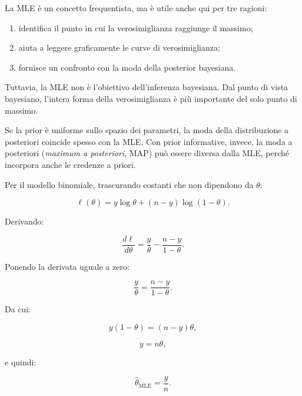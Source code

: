 \documentclass[
  italian,
  letterpaper,
  a4paper,
  11pt,
  open=any]{scrbook}
\providecommand{\tightlist}{%
  \setlength{\itemsep}{0pt}\setlength{\parskip}{0pt}}
\theoremstyle{plain}
\theoremstyle{definition}
\theoremstyle{definition}
\theoremstyle{remark}
\begin{document}
La MLE è un concetto frequentista, ma è utile anche qui per tre ragioni:

\begin{enumerate}
\def\labelenumi{\arabic{enumi}.}
\tightlist
\item
  identifica il punto in cui la verosimiglianza raggiunge il massimo;
\item
  aiuta a leggere graficamente le curve di verosimiglianza;
\item
  fornisce un confronto con la moda della posterior bayesiana.
\end{enumerate}

Tuttavia, la MLE non è l'obiettivo dell'inferenza bayesiana. Dal punto
di vista bayesiano, l'intera forma della verosimiglianza è più
importante del solo punto di massimo.

\begin{tcolorbox}[enhanced jigsaw, arc=.35mm, bottomrule=.15mm, bottomtitle=1mm, breakable, colback=white, colbacktitle=quarto-callout-note-color!10!white, colframe=quarto-callout-note-color-frame, coltitle=black, left=2mm, leftrule=.75mm, opacityback=0, opacitybacktitle=0.6, rightrule=.15mm, title=\textcolor{quarto-callout-note-color}{\faInfo}\hspace{0.5em}{MLE, MAP e posterior}, titlerule=0mm, toprule=.15mm, toptitle=1mm]

Se la prior è uniforme sullo spazio dei parametri, la moda della
distribuzione a posteriori coincide spesso con la MLE. Con prior
informative, invece, la moda a posteriori (\emph{maximum a posteriori},
MAP) può essere diversa dalla MLE, perché incorpora anche le credenze a
priori.

\end{tcolorbox}

\begin{tcolorbox}[enhanced jigsaw, arc=.35mm, bottomrule=.15mm, bottomtitle=1mm, breakable, colback=white, colbacktitle=quarto-callout-note-color!10!white, colframe=quarto-callout-note-color-frame, coltitle=black, left=2mm, leftrule=.75mm, opacityback=0, opacitybacktitle=0.6, rightrule=.15mm, title=\textcolor{quarto-callout-note-color}{\faInfo}\hspace{0.5em}{Derivazione opzionale: MLE binomiale}, titlerule=0mm, toprule=.15mm, toptitle=1mm]

Per il modello binomiale, trascurando costanti che non dipendono da
\(\theta\):

\[
\ell(\theta) = y\log\theta + (n-y)\log(1-\theta).
\]

Derivando:

\[
\frac{d\ell}{d\theta}
= \frac{y}{\theta} - \frac{n-y}{1-\theta}.
\]

Ponendo la derivata uguale a zero:

\[
\frac{y}{\theta} = \frac{n-y}{1-\theta}.
\]

Da cui:

\[
y(1-\theta) = (n-y)\theta,
\]

\[
y = n\theta,
\]

e quindi:

\[
\hat{\theta}_{\text{MLE}} = \frac{y}{n}.
\]

\end{tcolorbox}
\end{document}
